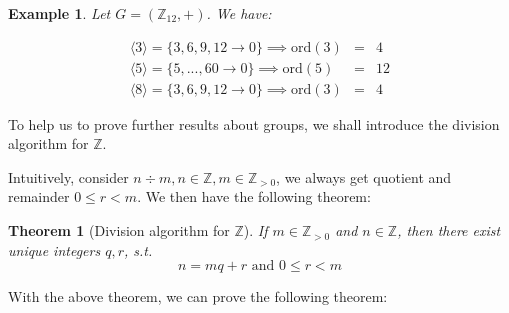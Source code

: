 \documentclass{article}
\theoremstyle{MyNonumberplain}
\theoremstyle{break}
\newcommand{\Z}{\mathbb{Z}}
\newcommand{\cyclic}[1]{\langle #1 \rangle}
\newcommand{\infixand}{\text{ and }}
\newcommand{\ord}[1]{\text{ord}(#1)}
\theoremstyle{break}
\newtheorem{theorem}{Theorem}[section]
\newtheorem{example}{Example}[section]
\theoremstyle{break}
\theoremstyle{definition}
\theoremstyle{break}
\begin{document}
\begin{expbox}
    \begin{example}
        Let $G=(\Z_12,+)$. We have:
        
        \begin{eqnarray*}
            \cyclic{3} =  \{3,6,9,12\to 0\}\implies\ord{3}&=&4\\
            \cyclic{5} =  \{5,...,60\to 0\}\implies\ord{5}&=&12\\
            \cyclic{8} =  \{3,6,9,12\to 0\}\implies\ord{3}&=&4
        \end{eqnarray*}
    \end{example}
\end{expbox}

To help us to prove further results about groups, we shall introduce the division algorithm for $\Z$.

Intuitively, consider $n \div m, n \in \mathbb{Z}, m \in \mathbb{Z}_{> 0}$, we always get quotient and remainder $0 \leqslant r < m$. We then have the following theorem:

\begin{thmbox}
    \begin{theorem}[Division algorithm for $\Z$]
        If $m\in\Z_{>0}$ and $n\in\Z$, then there exist unique integers $q,r$, s.t.
        $$n=mq+r \infixand   0\leq r < m$$
    \end{theorem}
\end{thmbox}

With the above theorem, we can prove the following theorem:
\end{document}
